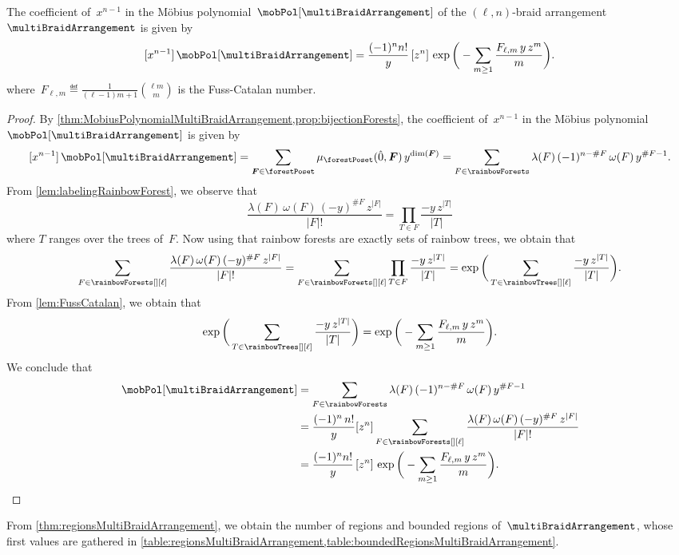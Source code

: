 \begin{theorem}
\label{thm:regionsMultiBraidArrangement}
The coefficient of~$x^{n-1}$ in the M\"obius polynomial~$\mobPol[{\multiBraidArrangement}]$ of the $(\ell,n)$-braid arrangement~$\multiBraidArrangement$ is given by
\[
[x^{n-1}] \, \mobPol[{\multiBraidArrangement}] = \frac{(-1)^n n!}{y} \, [z^n] \, \exp \bigg( - \sum_{m \ge 1} \frac{F_{\ell,m} \, y \, z^m}{m} \bigg).
\]
where~$\displaystyle F_{\ell,m} \eqdef \frac{1}{(\ell-1)m+1} \binom{\ell m}{m}$ is the Fuss-Catalan number.
\end{theorem}

\begin{proof}
By \cref{thm:MobiusPolynomialMultiBraidArrangement,prop:bijectionForests}, the coefficient of~$x^{n-1}$ in the M\"obius polynomial~$\mobPol[{\multiBraidArrangement}]$ is given by
\[
[x^{n-1}] \, \mobPol[{\multiBraidArrangement}] = \sum_{\b{F} \in \forestPoset} \mu_{\forestPoset}(\hat 0, \b{F}) \, y^{\dim(\b{F})} = \sum_{F \in \rainbowForests} \lambda(F) \, (-1)^{n-\#F} \, \omega(F) \, y^{\#F-1}.
\]
From \cref{lem:labelingRainbowForest}, we observe that
\[
\frac{\lambda(F) \, \omega(F) \, (-y)^{\#F} \, z^{|F|}}{|F|!} = \prod_{T \in F} \frac{-y \, z^{|T|}}{|T|}
\]
where $T$ ranges over the trees of~$F$.
Now using that rainbow forests are exactly sets of rainbow trees, we obtain that
\[
\sum_{F \in \rainbowForests[][\ell]} \frac{ \lambda(F) \, \omega(F) \, (-y)^{\#F} \, z^{|F|}}{|F|!} = \sum_{F \in \rainbowForests[][\ell]} \prod_{T \in F} \frac{-y \, z^{|T|}}{|T|} = \exp \bigg( \sum_{T \in \rainbowTrees[][\ell]} \frac{-y \, z^{|T|}}{|T|} \bigg).
\]
From \cref{lem:FussCatalan}, we obtain that
\[
\exp \bigg( \sum_{T \in \rainbowTrees[][\ell]} \frac{-y \, z^{|T|}}{|T|} \bigg) = \exp \bigg( - \sum_{m \ge 1} \frac{F_{\ell,m} \, y \, z^m}{m} \bigg).
\]
We conclude that
\begin{align*}
[x^{n-1}] \, \mobPol[{\multiBraidArrangement}] 
& = \sum_{F \in \rainbowForests}  \lambda(F) \, (-1)^{n-\#F} \, \omega(F) \, y^{\#F-1} \\
& = \frac{(-1)^n \, n!}{y} [z^n] \sum_{F \in \rainbowForests[][\ell]} \frac{ \lambda(F) \, \omega(F) \, (-y)^{\#F} \, z^{|F|}}{|F|!} \\
& = \frac{(-1)^n n!}{y} \, [z^n] \, \exp \bigg( - \sum_{m \ge 1} \frac{F_{\ell,m} \, y \, z^m}{m} \bigg).
\qedhere
\end{align*}
\end{proof}

From \cref{thm:regionsMultiBraidArrangement}, we obtain the number of regions and bounded regions of~$\multiBraidArrangement$, whose first values are gathered in \cref{table:regionsMultiBraidArrangement,table:boundedRegionsMultiBraidArrangement}.

